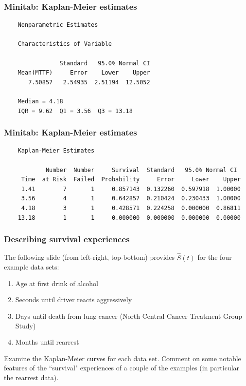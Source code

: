 \begin{frame}[fragile]
\frametitle{Minitab: Kaplan-Meier estimates}
\begin{verbatim}
    Nonparametric Estimates

    Characteristics of Variable

                Standard   95.0% Normal CI
    Mean(MTTF)     Error    Lower    Upper
       7.50857   2.54935  2.51194  12.5052

    Median = 4.18
    IQR = 9.62  Q1 = 3.56  Q3 = 13.18
\end{verbatim}
\end{frame}

\begin{frame}[fragile]
\frametitle{Minitab: Kaplan-Meier estimates}
\begin{verbatim}
    Kaplan-Meier Estimates

            Number  Number     Survival  Standard   95.0% Normal CI
     Time  at Risk  Failed  Probability     Error     Lower    Upper
     1.41        7       1     0.857143  0.132260  0.597918  1.00000
     3.56        4       1     0.642857  0.210424  0.230433  1.00000
     4.18        3       1     0.428571  0.224258  0.000000  0.86811
    13.18        1       1     0.000000  0.000000  0.000000  0.00000
\end{verbatim}
\end{frame}


\begin{frame}
\frametitle{Describing survival experiences}
The following slide (from left-right, top-bottom) provides $\widehat{S}(t)$ for the four example data sets:
\begin{enumerate}
    \item Age at first drink of alcohol
    \item Seconds until driver reacts aggressively
    \item Days until death from lung cancer (North Central Cancer Treatment Group Study)
    \item Months until rearrest
\end{enumerate}
Examine the Kaplan-Meier curves for each data set.  Comment on some notable features of the ``survival" experiences of a couple of the examples (in particular the rearrest data).
\end{frame}


